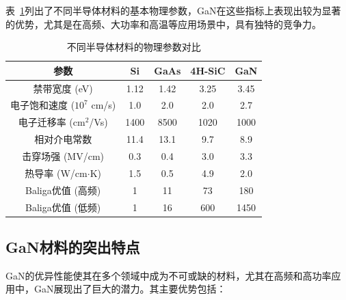 \documentclass[12pt,hyperref,a4paper,UTF8]{ctexart}
\begin{document}
表~\ref{tab:GaN_parameters}列出了不同半导体材料的基本物理参数，GaN在这些指标上表现出较为显著的优势，尤其是在高频、大功率和高温等应用场景中，具有独特的竞争力。

\begin{table}[h]
\centering
\caption{不同半导体材料的物理参数对比\cite{1019000519.nh}}
\begin{tabular}{|c|c|c|c|c|}
\hline
参数 & Si & GaAs & 4H-SiC & GaN \\
\hline
禁带宽度 (eV) & 1.12 & 1.42 & 3.25 & 3.45 \\
电子饱和速度 ($10^7$ cm/s) & 1.0 & 2.0 & 2.0 & 2.7 \\
电子迁移率 (cm$^2$/Vs) & 1400 & 8500 & 1020 & 1000 \\
相对介电常数& 11.4& 13.1& 9.7& 8.9\\
击穿场强 (MV/cm) & 0.3 & 0.4 & 3.0 & 3.3 \\
热导率 (W/cm$\cdot$K) & 1.5 & 0.5 & 4.9 & 2.0 \\
Baliga优值 (高频) & 1 & 11 & 73 & 180 \\
Baliga优值 (低频) & 1 & 16 & 600 & 1450 \\
\hline
\end{tabular}
\label{tab:GaN_parameters}
\end{table}

\subsection{GaN材料的突出特点}

GaN的优异性能使其在多个领域中成为不可或缺的材料，尤其在高频和高功率应用中，GaN展现出了巨大的潜力。其主要优势包括：
\end{document}
